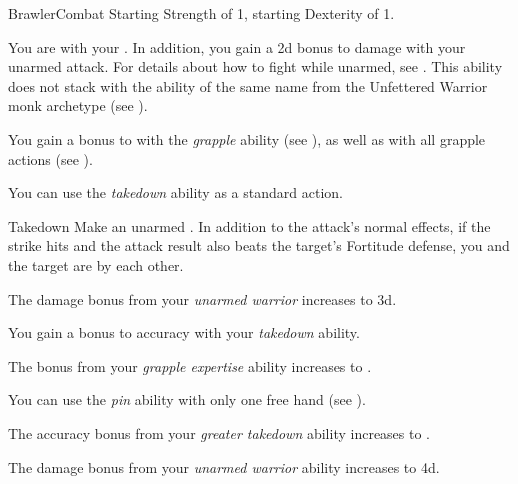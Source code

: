     \begin{feat}{Brawler}{Combat}
        \featpre Starting Strength of 1, starting Dexterity of 1.

         You are  with your .
        In addition, you gain a \plus2d bonus to damage with your unarmed attack.
        For details about how to fight while unarmed, see .
        This ability does not stack with the ability of the same name from the Unfettered Warrior monk archetype (see ).

         You gain a  bonus to  with the \textit{grapple} ability (see ), as well as with all grapple actions (see ).

         You can use the \textit{takedown} ability as a standard action.
        \begin{apability}{Takedown}
            Make an unarmed .
            In addition to the attack's normal effects, if the strike hits and the attack result also beats the target's Fortitude defense, you and the target are \grappled by each other.
        \end{apability}

         The damage bonus from your \textit{unarmed warrior} increases to \plus3d.

         You gain a  bonus to accuracy with your \textit{takedown} ability.

         The bonus from your \textit{grapple expertise} ability increases to .

         You can use the \textit{pin} ability with only one free hand (see ).

         The accuracy bonus from your \textit{greater takedown} ability increases to .

         The damage bonus from your \textit{unarmed warrior} ability increases to \plus4d.
    \end{feat}

